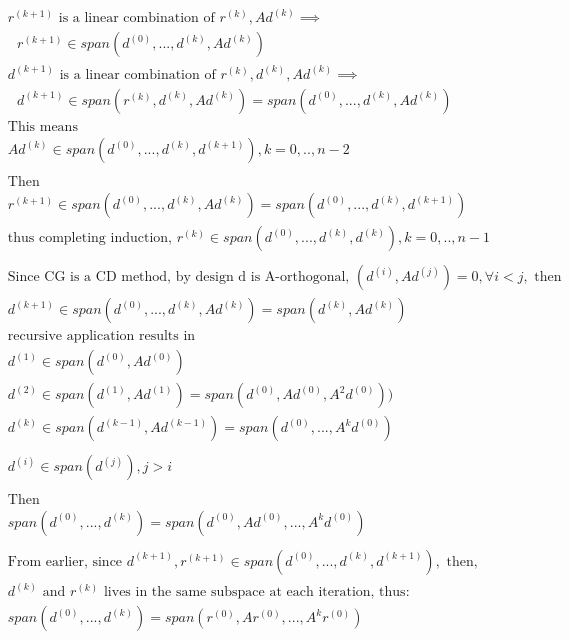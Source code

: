 \documentclass[12pt,letter]{article}
\begin{document}
\begin{enumerate}
\begin{align*}
    &r^{(k+1)} \text{ is a linear combination of } r^{(k)}, Ad^{(k)} \implies\\
    &\text{\ \ \ \ \ \ \ \ } r^{(k+1)} \in span(d^{(0)}, ..., d^{(k)}, Ad^{(k)})\\
    &d^{(k+1)} \text{ is a linear combination of } r^{(k)}, d^{(k)}, Ad^{(k)} \implies\\
    &\text{\ \ \ \ \ \ \ \ } d^{(k+1)} \in span(r^{(k)}, d^{(k)}, Ad^{(k)}) = span(d^{(0)}, ..., d^{(k)}, Ad^{(k)})\\
    &\text{This means}\\
    &Ad^{(k)} \in span(d^{(0)}, ..., d^{(k)}, d^{(k+1)}), k=0,..,n-2\\
    \\
    &\text{Then}\\
    &r^{(k+1)} \in span(d^{(0)}, ..., d^{(k)}, Ad^{(k)})=span(d^{(0)}, ..., d^{(k)}, d^{(k+1)})\\
    &\text{thus completing induction, } r^{(k)} \in span(d^{(0)}, ..., d^{(k)}, d^{(k)}), k=0,..,n-1\\
  \end{align*}
  \begin{align*}
    &\text{Since CG is a CD method, by design d is A-orthogonal, } (d^{(i)},Ad^{(j)})=0, \forall i<j, \text{ then}\\
    &d^{(k+1)} \in span(d^{(0)}, ..., d^{(k)}, Ad^{(k)})=span(d^{(k)}, Ad^{(k)})\\
    &\text{recursive application results in}\\
    &d^{(1)} \in span(d^{(0)}, Ad^{(0)})\\
    &d^{(2)} \in span(d^{(1)}, Ad^{(1)})=span(d^{(0)}, Ad^{(0)}, A^2 d^{(0)}))\\
    &d^{(k)} \in span(d^{(k-1)}, A d^{(k-1)}) = span(d^{(0)},..., A^k d^{(0)})\\
    \\
    &d^{(i)} \in span(d^{(j)}),j>i\\
    \\
    &\text{Then}\\
    &span(d^{(0)}, ..., d^{(k)}) = span(d^{(0)}, Ad^{(0)}, ..., A^k d^{(0)})\\
    \\
    &\text{From earlier, since } d^{(k+1)}, r^{(k+1)} \in span(d^{(0)}, ..., d^{(k)}, d^{(k+1)}), \text{ then,}\\
    &d^{(k)} \text{ and } r^{(k)} \text{ lives in the same subspace at each iteration, thus:}\\
    &span(d^{(0)}, ..., d^{(k)}) = span(r^{(0)}, Ar^{(0)}, ..., A^k r^{(0)})\\
  \end{align*}
  

\end{enumerate}
\end{document}
